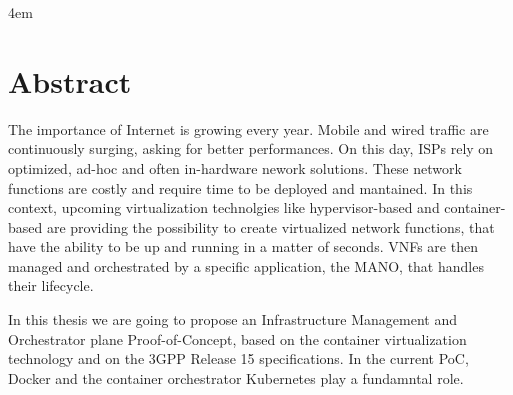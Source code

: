 \cleardoublepage
{}

\thispagestyle{empty}

\vspace*{\fill}
\par
\begingroup
\leftskip4em
\rightskip\leftskip
\section*{\centering Abstract}
The importance of Internet is growing every year. Mobile and wired traffic are
continuously surging, asking for better performances. On this day, ISPs rely on
optimized, ad-hoc and often in-hardware nework solutions. These network
functions are costly and require time to be deployed and mantained. In this
context, upcoming virtualization technolgies like hypervisor-based and
container-based are providing the possibility to create virtualized network
functions, that have the ability to be up and running in a matter of seconds.
VNFs are then managed and orchestrated by a specific application, the MANO, that
handles their lifecycle.

In this thesis we are going to propose an Infrastructure Management and
Orchestrator plane Proof-of-Concept, based on the container virtualization
technology and on the 3GPP Release 15 specifications. In the current PoC, Docker
and the container orchestrator Kubernetes play a fundamntal role.
\par
\endgroup
\vspace*{\fill}
